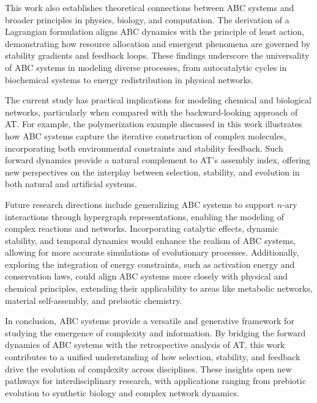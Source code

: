 \documentclass[entropy,article,submit,pdftex,oneauthor]{Definitions/mdpi}
\begin{document}
This work also establishes theoretical connections between ABC systems and broader principles in physics, biology, and computation. The derivation of a Lagrangian formulation aligns ABC dynamics with the principle of least action, demonstrating how resource allocation and emergent phenomena are governed by stability gradients and feedback loops. These findings underscore the universality of ABC systems in modeling diverse processes, from autocatalytic cycles in biochemical systems to energy redistribution in physical networks.

The current study has practical implications for modeling chemical and biological networks, particularly when compared with the backward-looking approach of AT. For example, the polymerization example discussed in this work illustrates how ABC systems capture the iterative construction of complex molecules, incorporating both environmental constraints and stability feedback. Such forward dynamics provide a natural complement to AT’s assembly index, offering new perspectives on the interplay between selection, stability, and evolution in both natural and artificial systems.

Future research directions include generalizing ABC systems to support \( n \)-ary interactions through hypergraph representations, enabling the modeling of complex reactions and networks. Incorporating catalytic effects, dynamic stability, and temporal dynamics would enhance the realism of ABC systems, allowing for more accurate simulations of evolutionary processes. Additionally, exploring the integration of energy constraints, such as activation energy and conservation laws, could align ABC systems more closely with physical and chemical principles, extending their applicability to areas like metabolic networks, material self-assembly, and prebiotic chemistry.

In conclusion, ABC systems provide a versatile and generative framework for studying the emergence of complexity and information. By bridging the forward dynamics of ABC systems with the retrospective analysis of AT, this work contributes to a unified understanding of how selection, stability, and feedback drive the evolution of complexity across disciplines. These insights open new pathways for interdisciplinary research, with applications ranging from prebiotic evolution to synthetic biology and complex network dynamics.
\end{document}
